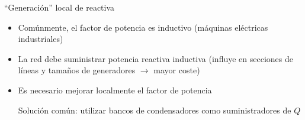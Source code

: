 \documentclass[aspectratio=169, usenames,svgnames,dvipsnames]{beamer}
\begin{document}
\begin{frame}{``Generación'' local de reactiva}
    \begin{itemize}
    \item Comúnmente, el factor de potencia es \alert{inductivo} (máquinas eléctricas
    industriales)

    \vspace{5mm}
    \item La red debe suministrar potencia reactiva inductiva (influye en secciones de líneas y tamaños de generadores $\rightarrow$ \alert{mayor coste})

    \vspace{5mm}
    \item Es necesario mejorar \alert{localmente} el factor de potencia

    \vspace{2mm}
    Solución
    común: utilizar \alert{bancos de condensadores} como suministradores de
    $Q$
    \end{itemize}
\end{frame}

\end{document}
